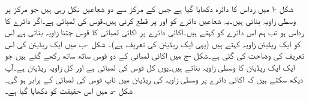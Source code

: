 شکل -ا میں رداس  کا دائرہ دکھایا گیا ہے جس کے مرکز  سے دو شعاعیں نکل رہی ہیں جو مرکز پر وسطی زاویہ  بناتی ہیں۔یہ شعاعیں دائرے کو  اور  پر قطع کرتی ہیں۔قوس  کی لمبائی  ہے۔اگر دائرے کا رداس  ہو تب ہم اس دائرے کو   کہتے ہیں۔اکائی دائرے پر اکائی لمبائی کا قوس جتنا زاویہ بناتی ہے اس کو ایک ریڈیئن زاویہ کہتے ہیں (یہی ایک ریڈیئن کی تعریف ہے)۔ شکل -ب میں ایک ریڈیئن کی اس تعریف کی وضاحت کی گئی ہے۔شکل -ج میں اکائی لمبائی کے دو قوس ساتھ ساتھ رکھے گئے ہیں جو ایک ایک ریڈیئن کا وسطی زاویہ بناتے ہیں۔یوں کل قوس کی لمبائی  ہے اور کل زاویہ  ریڈیئن ہے۔آپ دیکھ سکتے ہیں کہ اکائی دائرے پر وسطی زاویہ کی ریڈیئن میں ناپ قوس کی لمبائی کے برابر ہو گی۔شکل -د میں اس حقیقت کو دکھایا گیا ہے۔
